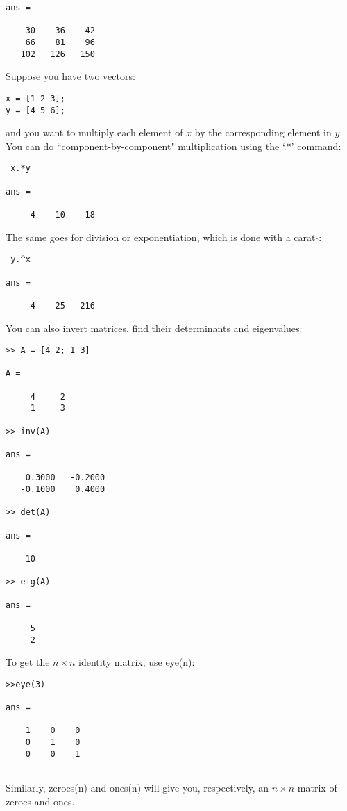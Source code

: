 \documentclass[12pt]{report}
\begin{document}
\begin{enumerate}
\begin{verbatim}
ans =

    30    36    42
    66    81    96
   102   126   150
\end{verbatim}
Suppose you have two vectors:
\begin{verbatim}
x = [1 2 3];
y = [4 5 6];
\end{verbatim}
and you want to multiply each element of $x$ by the corresponding element in $y$. You can do ``component-by-component" multiplication
using the `.*' command:
\begin{verbatim}
 x.*y

ans =

     4    10    18
 \end{verbatim}
 The same goes for division or exponentiation, which is done with a carat \quad $\hat{}$\quad :
 \begin{verbatim}
 y.^x

ans =

     4    25   216
\end{verbatim}
You can also invert matrices, find their determinants and eigenvalues:
\begin{verbatim}
>> A = [4 2; 1 3]

A =

     4     2
     1     3

>> inv(A)

ans =

    0.3000   -0.2000
   -0.1000    0.4000

>> det(A)

ans =

    10

>> eig(A)

ans =

     5
     2
\end{verbatim}
\pagebreak

To get the $n\times n$ identity matrix, use eye(n):
\begin{verbatim}
>>eye(3)

ans =

    1    0    0
    0    1    0
    0    0    1
 
\end{verbatim}
Similarly, zeroes(n) and ones(n) will give you, respectively, an $n\times n$ matrix of zeroes and ones. 

\end{enumerate}
\end{document}
